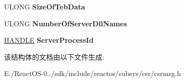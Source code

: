 \begin{DoxyCompactItemize}
\mbox{\label{struct___c_s_r___a_p_i___c_o_n_n_e_c_t_i_n_f_o_a9187848354d6093d8677ed4a2c8b598b}} 
U\+L\+O\+NG {\bfseries Size\+Of\+Teb\+Data}
\item 
\mbox{\label{struct___c_s_r___a_p_i___c_o_n_n_e_c_t_i_n_f_o_a987c672dea886c28d6354a4ccaaa7866}} 
U\+L\+O\+NG {\bfseries Number\+Of\+Server\+Dll\+Names}
\item 
\mbox{\label{struct___c_s_r___a_p_i___c_o_n_n_e_c_t_i_n_f_o_a27b0f71d2f82d7e6339876f91d0a105c}} 
\hyperlink{interfacevoid}{H\+A\+N\+D\+LE} {\bfseries Server\+Process\+Id}
\end{DoxyCompactItemize}


该结构体的文档由以下文件生成\+:\begin{DoxyCompactItemize}
\item 
E\+:/\+React\+O\+S-\/0../sdk/include/reactos/subsys/csr/csrmsg.\+h\end{DoxyCompactItemize}
